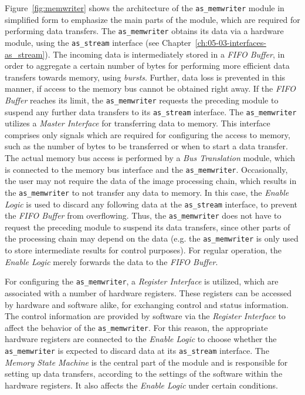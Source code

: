 Figure~\ref{fig:memwriter} shows the architecture of the \texttt{as\_memwriter} module in simplified form to emphasize the main parts of the module, which are required for performing data transfers. 
The \texttt{as\_memwriter} obtains its data via a hardware module, using the \texttt{as\_stream} interface (see Chapter~\ref{ch:05-03-interfaces-as_stream}).
The incoming data is intermediately stored in a \textit{FIFO Buffer}, in order to aggregate a certain number of bytes for performing more efficient data transfers towards memory, using \textit{bursts}.
Further, data loss is prevented in this manner, if access to the memory bus cannot be obtained right away.
If the \textit{FIFO Buffer} reaches its limit, the \texttt{as\_memwriter} requests the preceding module to suspend any further data transfers to its \texttt{as\_stream} interface.
The \texttt{as\_memwriter} utilizes a \textit{Master Interface} for transferring data to memory.
This interface comprises only signals which are required for configuring the access to memory, such as the number of bytes to be transferred or when to start a data transfer. 
The actual memory bus access is performed by a \textit{Bus Translation} module, which is connected to the memory bus interface and the \texttt{as\_memwriter}.
Occasionally, the user may not require the data of the image processing chain, which results in the \texttt{as\_memwriter} to not transfer any data to memory.
In this case, the \textit{Enable Logic} is used to discard any following data at the \texttt{as\_stream} interface, to prevent the \textit{FIFO Buffer} from overflowing.
Thus, the \texttt{as\_memwriter} does not have to request the preceding module to suspend its data transfers, since other parts of the processing chain may depend on the data (e.g. the \texttt{as\_memwriter} is only used to store intermediate results for control purposes).
For regular operation, the \textit{Enable Logic} merely forwards the data to the \textit{FIFO Buffer}.

For configuring the \texttt{as\_memwriter}, a \textit{Register Interface} is utilized, which are associated with a number of hardware registers. 
These registers can be accessed by hardware and software alike, for exchanging control and status information. 
The control information are provided by software via the \textit{Register Interface} to affect the behavior of the \texttt{as\_memwriter}.
For this reason, the appropriate hardware registers are connected to the \textit{Enable Logic} to choose whether the \texttt{as\_memwriter} is expected to discard data at its \texttt{as\_stream} interface.
The \textit{Memory State Machine} is the central part of the module and is responsible for setting up data transfers, according to the settings of the software within the hardware registers.
It also affects the \textit{Enable Logic} under certain conditions.

